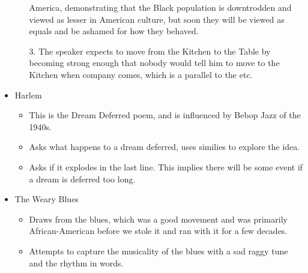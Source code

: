 \documentclass[10pt]{article}
\begin{document}
\begin{itemize}
\begin{itemize}
				America, demonstrating that the Black
				population is downtrodden and viewed as
				lesser in American culture, but soon they
				will be viewed as equals and be ashamed
				for how they behaved.
			\item[3. ] The speaker expects to move 
				from the Kitchen to the Table by becoming
				strong enough that nobody would tell him
				to move to the Kitchen when company comes,
				which is a parallel to the etc.
		\end{itemize}
	\item Harlem
		\begin{itemize}
			\item This is the Dream Deferred poem, and
				is influenced by Bebop Jazz of the 1940s.
			\item Asks what happens to a dream deferred,
				uses similies to explore the idea.
			\item Asks if it explodes in the last line.
				This implies there will be some event if
				a dream is deferred too long.
		\end{itemize}
	\item The Weary Blues
		\begin{itemize}
			\item Draws from the blues, which was a good
				movement and was primarily African-American
				before we stole it and ran with it for a 
				few decades.
			\item Attempts to capture the musicality of
				the blues with a sad raggy tune and the 
				rhythm in words.
		\end{itemize}
\end{itemize}
\end{document}
